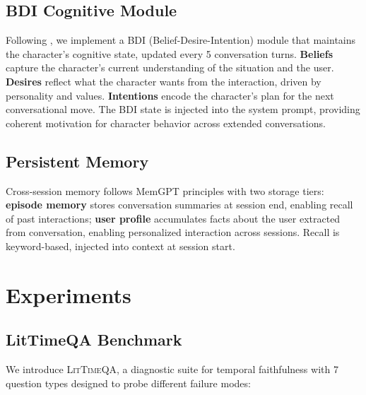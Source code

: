 \documentclass[11pt,a4paper]{article}
\begin{document}
\subsection{BDI Cognitive Module}
\label{sec:bdi}

Following \citet{wang2025characterbox}, we implement a BDI (Belief-Desire-Intention) module that maintains the character's cognitive state, updated every 5 conversation turns.
\textbf{Beliefs} capture the character's current understanding of the situation and the user.
\textbf{Desires} reflect what the character wants from the interaction, driven by personality and values.
\textbf{Intentions} encode the character's plan for the next conversational move.
The BDI state is injected into the system prompt, providing coherent motivation for character behavior across extended conversations.

\subsection{Persistent Memory}
\label{sec:memory}

Cross-session memory follows MemGPT \citep{packer2023memgpt} principles with two storage tiers:
\textbf{episode memory} stores conversation summaries at session end, enabling recall of past interactions;
\textbf{user profile} accumulates facts about the user extracted from conversation, enabling personalized interaction across sessions.
Recall is keyword-based, injected into context at session start.

\section{Experiments}
\label{sec:experiments}

\subsection{LitTimeQA Benchmark}
\label{sec:littimeqa}

We introduce \textsc{LitTimeQA}, a diagnostic suite for temporal faithfulness with 7 question types designed to probe different failure modes:
\end{document}
